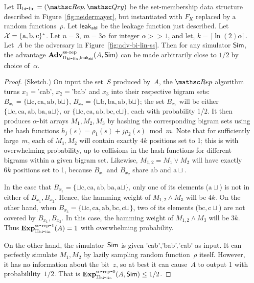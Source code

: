 \begin{theorem}\label{thm:bi-lin-ss}
Let $\setprim_{\bilin}= (\Rep, \Qry)$ be the set-membership data structure described in Figure~\ref{fig:neidermayer}, but instantiated with $F_{K}$ replaced by a random functions~$\rho$.  Let ${\sf leak}_{\mathsf{abl}}$ be the leakage function just described.   Let~${\cal X}=\{\mathrm{a,b,c}\}^*$. Let $n=3$,  $m=3\alpha $ for integer $\alpha >> 1$, and let, $k = \lceil \ln(2) \alpha \rceil$.  Let~$A$ be the adversary in Figure~\ref{fig:adv-bi-lin-ss}.  Then for any simulator ${\sf Sim}$, the advantage $\mathrm{\mathbf{Adv}}^{\mathrm{ss\mbox{-}rep}}_{\Pi_{\mathrm{bi}\mbox{-}\mathrm{lin}},{\sf leak}_{\mathsf{abl}}}(A,{\sf Sim})$ can be made arbitrarily close to $1/2$ by choice of~$\alpha$.
\end{theorem}
\begin{proof}(Sketch.)
On input the set~$S$ produced by~$A$, the $\Rep$ algorithm turns $x_1=$'cab', $x_2=$'bab' and $x_3$ into their respective bigram sets: $B_{x_1}=\{\sqcup\mathrm{c},\mathrm{ca},\mathrm{ab},\mathrm{b}\sqcup\}$, $B_{x_2}=\{\sqcup\mathrm{b},\mathrm{ba},\mathrm{ab}, \mathrm{b}\sqcup \}$; the set $B_{x_3}$ will be either $\{\sqcup\mathrm{c},\mathrm{ca},\mathrm{ab},\mathrm{ba}, \mathrm{a}\sqcup\}$, or $\{\sqcup\mathrm{c},\mathrm{ca},\mathrm{ab},\mathrm{bc}, \mathrm{c}\sqcup\}$, each with probability 1/2.  It then produces $\alpha$-bit arrays $M_1, M_2, M_3$ by hashing the corresponding bigram sets using the hash functions $h_j(s)=\rho_1(s)+ j\rho_2(s) \bmod m$.  Note that for sufficiently large~$m$, each of $M_1,M_2$ will contain exactly $4k$ positions set to 1; this is with overwhelming probability, up to collisions in the hash functions for different bigrams within a given bigram set.  Likewise, $M_{1,2}=M_1 \vee M_2$ will have exactly $6k$ positions set to 1, because $B_{x_1}$ and $B_{x_2}$ share $\mathrm{ab}$ and $\mathrm{a}\sqcup$.

In the case that $B_{x_3}=\{\sqcup\mathrm{c},\mathrm{ca},\mathrm{ab},\mathrm{ba}, \mathrm{a}\sqcup\}$, only one of its elements ($\mathrm{a}\sqcup$) is not in either of $B_{x_1},B_{x_2}$.  Hence, the hamming weight of $M_{1,2}\wedge M_3$ will be $4k$.  On the other hand, when $B_{x_3} = \{\sqcup\mathrm{c},\mathrm{ca},\mathrm{ab},\mathrm{bc}, \mathrm{c}\sqcup\}$, two of its elements ($\mathrm{bc}, \mathrm{c}\sqcup$) are not covered by $B_{x_1},B_{x_2}$.  In this case, the hamming weight of $M_{1,2} \wedge M_3$ will be $3k$.  Thus $\mathrm{\mathbf{Exp}}^{\mathrm{ss\mbox{-}rep\mbox{-}1}}_{\Pi_{\mathrm{bi}\mbox{-}\mathrm{lin}}}(A)=1$ with overwhelming probability.

On the other hand, the simulator~${\sf Sim}$ is given 'cab','bab','cab' as
input.  It can perfectly simulate $M_1,M_2$ by lazily sampling random
function~$\rho$ itself.  However, it has no information about the
bit~$z$, so at best it can cause~$A$ to output 1 with
probabilility~$1/2$.  That is $\mathrm{\mathbf{Exp}}^{\mathrm{ss\mbox{-}rep\mbox{-}0}}_{\Pi_{\mathrm{bi}\mbox{-}\mathrm{lin}}}(A,{\sf Sim}) \leq 1/2$.
\end{proof}




